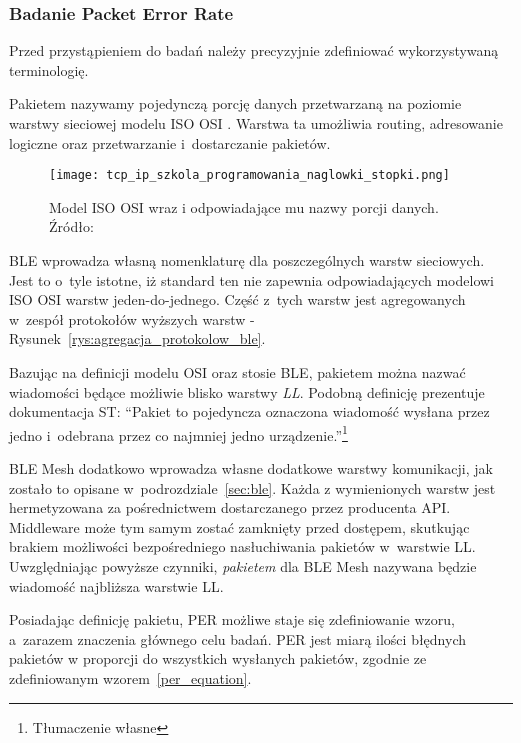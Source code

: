 \subsubsection{Badanie Packet Error Rate}
Przed przystąpieniem do badań należy precyzyjnie zdefiniować wykorzystywaną terminologię.

Pakietem nazywamy pojedynczą porcję danych przetwarzaną na poziomie warstwy sieciowej modelu ISO OSI \cite{sa_tcpip_nodate}.
Warstwa ta umożliwia routing, adresowanie logiczne oraz przetwarzanie i~dostarczanie pakietów.

\begin{figure}[!ht]
	\centering \texttt{[image: tcp\_ip\_szkola\_programowania\_naglowki\_stopki.png]} 
	\caption{Model ISO OSI wraz i odpowiadające mu nazwy porcji danych. Źródło: \cite{sa_tcpip_nodate}}
	\label{rys:iso_osi_model_nazwy_grup_danych}
\end{figure}

\gls{BLE} wprowadza własną nomenklaturę dla poszczególnych warstw sieciowych. Jest to o~tyle istotne, iż standard ten
nie zapewnia odpowiadających modelowi ISO OSI warstw jeden-do-jednego. Część z~tych warstw jest agregowanych w~zespół 
protokołów wyższych warstw - Rysunek~\ref{rys:agregacja_protokolow_ble}. %

Bazując na definicji modelu OSI oraz stosie BLE, pakietem można nazwać wiadomości będące możliwie blisko
warstwy \textit{\gls{LL}}. Podobną definicję prezentuje dokumentacja ST:
\enquote{Pakiet to pojedyncza oznaczona wiadomość wysłana przez jedno i~odebrana przez 
co najmniej jedno urządzenie.}\footnote{Tłumaczenie własne}~\cite{stmicroelectronics_pm0271_2021}

BLE Mesh dodatkowo wprowadza własne dodatkowe warstwy komunikacji, jak zostało to opisane w~podrozdziale~\ref{sec:ble}.
Każda z wymienionych warstw jest hermetyzowana za pośrednictwem dostarczanego przez producenta \gls{API}.
Middleware może tym samym zostać zamknięty przed dostępem, skutkując brakiem możliwości 
bezpośredniego nasłuchiwania pakietów w~warstwie \gls{LL}. Uwzględniając powyższe czynniki, \textit{pakietem} dla BLE Mesh nazywana będzie wiadomość najbliższa warstwie \gls{LL}.

Posiadając definicję pakietu, \gls{PER} możliwe staje się zdefiniowanie wzoru, a~zarazem znaczenia
głównego celu badań. PER jest miarą ilości błędnych pakietów w proporcji do wszystkich wysłanych 
pakietów, zgodnie ze zdefiniowanym wzorem~\ref{per_equation}.

